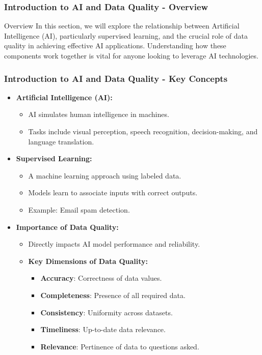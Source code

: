 \documentclass[aspectratio=169]{beamer}
\begin{document}
\frame{\titlepage}

\begin{frame}[fragile]
    \frametitle{Introduction to AI and Data Quality - Overview}
    \begin{block}{Overview}
        In this section, we will explore the relationship between Artificial Intelligence (AI), particularly supervised learning, and the crucial role of data quality in achieving effective AI applications. Understanding how these components work together is vital for anyone looking to leverage AI technologies.
    \end{block}
\end{frame}

\begin{frame}[fragile]
    \frametitle{Introduction to AI and Data Quality - Key Concepts}
    \begin{itemize}
        \item \textbf{Artificial Intelligence (AI):}
            \begin{itemize}
                \item AI simulates human intelligence in machines.
                \item Tasks include visual perception, speech recognition, decision-making, and language translation.
            \end{itemize}
        
        \item \textbf{Supervised Learning:}
            \begin{itemize}
                \item A machine learning approach using labeled data.
                \item Models learn to associate inputs with correct outputs.
                \item Example: Email spam detection.
            \end{itemize}
        
        \item \textbf{Importance of Data Quality:}
            \begin{itemize}
                \item Directly impacts AI model performance and reliability.
                \item \textbf{Key Dimensions of Data Quality:}
                    \begin{itemize}
                        \item \textbf{Accuracy}: Correctness of data values.
                        \item \textbf{Completeness}: Presence of all required data.
                        \item \textbf{Consistency}: Uniformity across datasets.
                        \item \textbf{Timeliness}: Up-to-date data relevance.
                        \item \textbf{Relevance}: Pertinence of data to questions asked.
                    \end{itemize}
            \end{itemize}
    \end{itemize}
\end{frame}
\end{document}
